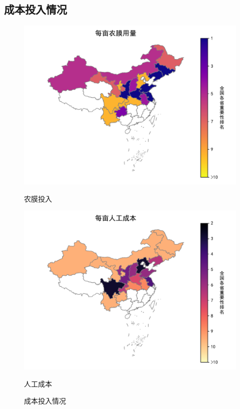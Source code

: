 \subsection{成本投入情况}
\begin{figure}[htb]
  \centering
  \begin{minipage}[t]{0.49\linewidth}
    \centering
    \includegraphics[width=\linewidth]{figs/InputCost_Film}
    \caption{农膜投入}
    \label{fig:InputCost_Film}
  \end{minipage}
  \hfill
  \begin{minipage}[t]{0.49\linewidth}
    \centering
    \includegraphics[width=\linewidth]{figs/InputCost_Labor}
    \caption{人工成本}
    \label{fig:InputCost_Labor}
  \end{minipage}
  \caption{成本投入情况}
  \label{fig:input_FL}
\end{figure}

